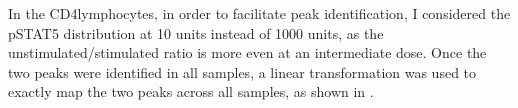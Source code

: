 In the CD4\positive lymphocytes, in order to facilitate peak identification, I considered the pSTAT5 distribution at 10 units instead of 1000 units,
as the unstimulated/stimulated ratio is more even at an intermediate dose.
Once the two peaks were identified in all samples,
a linear transformation was used to exactly map the two peaks across all samples, as shown in .


